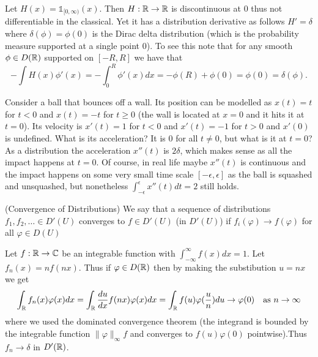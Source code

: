 \documentclass[twoside, a4paper, 10pt]{amsart}
\begin{document}
\begin{eg} Let $H(x) = \mathds{1}_{[0, \infty)} (x)$. Then $H:\mathbb{R} \to \mathbb{R}$ is discontinuous at $0$ thus not differentiable in the classical. Yet it has a distribution derivative as follows $H' = \delta$ where $\delta(\phi) = \phi(0)$ is the Dirac delta distribution (which is the probability measure supported at a single point $0$). To see this note that for any smooth $\phi \in D(\mathbb{R})$ supported on $[-R,R]$ we have that $$-\int H(x) \phi'(x) = -\int_0^R \phi'(x) dx = -\phi(R) + \phi(0) = \phi(0) = \delta(\phi).  $$

\end{eg}

\begin{eg} Consider a ball that bounces off a wall. Its position can be modelled as $x(t) = t$ for $t<0$ and $x(t) = -t$ for $t \geq 0$ (the wall is located at $x=0$ and it hits it at $t = 0$). Its velocity is $x'(t) = 1$ for $t<0$ and $x'(t) = -1$ for $t>0$ and $x'(0)$ is undefined. What is its acceleration? It is $0$ for all $t \neq 0$, but what is it at $t = 0$? As a distribution the acceleration $x''(t)$ is $2\delta$, which makes sense as all the impact happens at $t=0$. Of course, in real life maybe $x''(t)$ is continuous and the impact happens on some very small time scale $[-\epsilon, \epsilon]$ as the ball is squashed and unsquashed, but nonetheless $\int_{-\epsilon}^{\epsilon} x''(t) dt = 2$ still holds. 

\end{eg}

\begin{mydef}(Convergence of Distributions) We say that a sequence of distributions $f_1,f_2, \ldots \in D'(U)$ converges to $f \in D'(U)$ (in $D'(U)$) if $f_i(\varphi) \to f(\varphi)$ for all $\varphi \in D(U)$

\end{mydef}

\begin{eg} Let $f:\mathbb{R} \to \mathbb{C}$ be an integrable function with $\int_{-\infty}^{\infty} f(x) dx = 1$. Let $f_n(x) = n f(nx)$. Thus if $\varphi \in D(\mathbb{R})$ then by making the substibution $u = nx$ we get $$\int_{\mathbb{R}} f_n(x) \varphi(x) dx = \int_{\mathbb{R}} \frac{du}{dx} f(nx) \varphi(x) dx = \int_{\mathbb{R}} f(u) \varphi(\frac{u}{n}) du \to \varphi(0) \quad \text{as } n \to \infty$$ where we used the dominated convergence theorem (the integrand is bounded by the integrable function $\| \varphi \|_{\infty} f$ and converges to $f(u)\varphi(0)$ pointwise).Thus $f_n \to \delta$ in $D'(\mathbb{R})$.

\end{eg}
\end{document}
